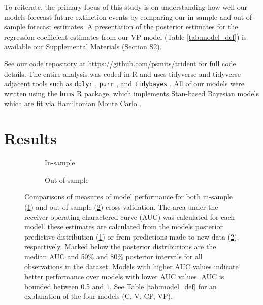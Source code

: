 \documentclass[12pt,letterpaper]{article}
\begin{document}
\begin{refsection}

To reiterate, the primary focus of this study is on understanding how well our models forecast future extinction events by comparing our in-sample and out-of-sample forecast estimates. A presentation of the posterior estimates for the regression coefficient estimates from our VP model (Table \ref{tab:model_def}) is available our Supplemental Materials (Section S2).

See our code repository at https://github.com/psmits/trident for full code details. The entire analysis was coded in R and uses tidyverse and tidyverse adjacent tools such as \texttt{dplyr} \citep{dplyr}, \texttt{purr} \citep{purrr}, and \texttt{tidybayes} \citep{tidybayes}. All of our models were written using the \texttt{brms} \citep{brms2017,brms2018} R package, which implements Stan-based Bayesian models which are fit via Hamiltonian Monte Carlo \citep{StanManual}.


\section{Results}


\begin{figure}[ht]
 \begin{subfigure}[ht]{0.45\textwidth}
  \caption{In-sample}
  \label{fig:auc_hist}
 \end{subfigure}
 \begin{subfigure}[ht]{0.45\textwidth}
  \caption{Out-of-sample}
  \label{fig:fold_auc}
 \end{subfigure}
 \caption{Comparisons of measures of model performance for both in-sample (\ref{fig:auc_hist}) and out-of-sample (\ref{fig:fold_auc}) cross-validation. The area under the receiver operating charactered curve (AUC) was calculated for each model. these estimates are calculated from the models posterior predictive distribution (\ref{fig:auc_hist}) or from predictions made to new data (\ref{fig:fold_auc}), respectively. Marked below the posterior distributions are the median AUC and 50\% and 80\% posterior intervals for all observations in the dataset. Models with higher AUC values indicate better performance over models with lower AUC values. AUC is bounded between 0.5 and 1. See Table \ref{tab:model_def} for an explanation of the four models (C, V, CP, VP).}
 \label{fig:auc_compare}
\end{figure}


\end{refsection}
\end{document}
